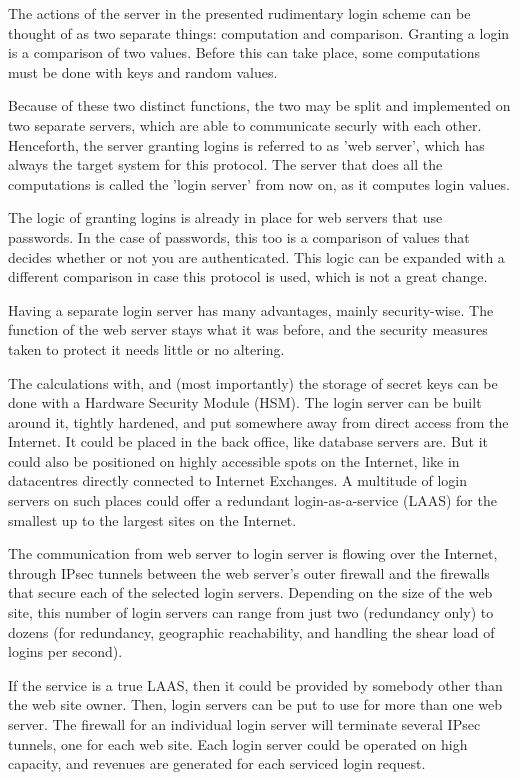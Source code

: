 The actions of the server in the presented rudimentary login scheme can be thought of as two separate things: computation and comparison.
Granting a login is a comparison of two values.
Before this can take place, some computations must be done with keys and random values.
\par
Because of these two distinct functions,
the two may be split and implemented on two separate servers,
which are able to communicate securly with each other.
Henceforth, the server granting logins
is referred to as 'web server',
which has always the target system for this protocol.
The server that does all the computations is called the 'login server' from now on, as it computes login values.
\par
The logic of granting logins is already in place for web servers that use passwords.
In the case of passwords, this too is a comparison of values that decides whether or not you are authenticated.
This logic can be expanded with a different comparison in case this protocol is used, which is not a great change.
\par
Having a separate login server has many advantages,
mainly security-wise.
The function of the web server stays what it was before,
and the security measures taken to protect it needs little or no altering.
\par
The calculations with, and (most importantly) the storage of secret keys can be done with a Hardware Security Module (HSM).
The login server can be built around it, tightly hardened, and put somewhere away from direct access from the Internet.
It could be placed in the back office, like database servers are.
But it could also be positioned on highly accessible spots on the Internet, like in datacentres directly connected to Internet Exchanges.
A multitude of login servers on such places could offer a redundant login-as-a-service (LAAS) for the smallest up to the largest sites on the Internet.
\par
The communication from web server to login server is flowing over the Internet,
through IPsec tunnels between the web server's outer firewall and the firewalls that secure each of the selected login servers.
Depending on the size of the web site, this number of login servers can range from just two (redundancy only) to dozens (for redundancy, geographic reachability, and handling the shear load of logins per second).
\par
If the service is a true LAAS, then it could be provided by somebody other than the web site owner.
Then, login servers can be put to use for more than one web server.
The firewall for an individual login server will terminate several IPsec tunnels, one for each web site.
Each login server could be operated on high capacity, and revenues are generated for each serviced login request.
